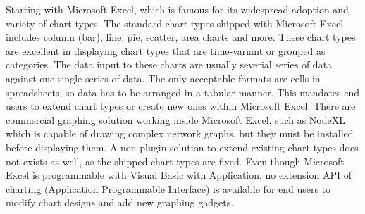 \documentclass[11pt, a4paper]{report}
\begin{document}
Starting with Microsoft Excel, which is famous for its widespread adoption and variety of chart types. The standard chart types shipped with Microsoft Excel includes column (bar), line, pie, scatter, area charts and more. These chart types are excellent in displaying chart types that are time-variant or grouped as categories. The data input to these charts are usually severial series of data against one single series of data. The only acceptable formats are cells in spreadsheets, so data has to be arranged in a tabular manner. This mandates end users to extend chart types or create new ones within Microsoft Excel. There are commercial graphing solution working inside Microsoft Excel, such as NodeXL which is capable of drawing complex network graphs, but they must be installed before displaying them. A non-plugin solution to extend existing chart types does not exists as well, as the shipped chart types are fixed. Even though Microsoft Excel is programmable with Visual Basic with Application, no extension API of charting (Application Programmable Interface) is available for end users to modify chart designs and add new graphing gadgets.
\end{document}
